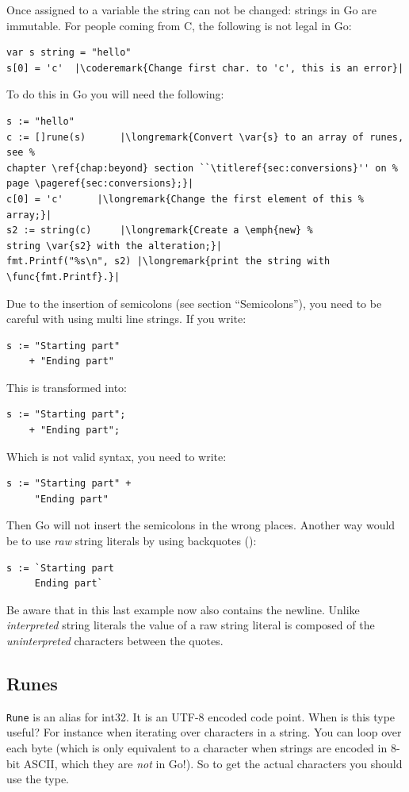Once assigned to a variable the string can not be changed: strings in Go are
immutable. For
people coming from C, the following is not legal in Go:
\begin{lstlisting}
var s string = "hello"
s[0] = 'c'  |\coderemark{Change first char. to 'c', this is an error}|
\end{lstlisting}
To do this in Go you will need the following:
\begin{lstlisting}
s := "hello"
c := []rune(s)	    |\longremark{Convert \var{s} to an array of runes, see %
chapter \ref{chap:beyond} section ``\titleref{sec:conversions}'' on %
page \pageref{sec:conversions};}|
c[0] = 'c'	    |\longremark{Change the first element of this %
array;}|
s2 := string(c)     |\longremark{Create a \emph{new} %
string \var{s2} with the alteration;}|
fmt.Printf("%s\n", s2) |\longremark{print the string with \func{fmt.Printf}.}|
\end{lstlisting}
\showremarks

\begin{lbar}
Due to the insertion of semicolons (see \cite{effective_go} section
``Semicolons''), you need to be careful with using multi line strings. If
you write:
\begin{lstlisting}
s := "Starting part"
    + "Ending part"
\end{lstlisting}
This is transformed into:
\begin{lstlisting}
s := "Starting part";
    + "Ending part";
\end{lstlisting}
Which is not valid syntax, you need to write:
\begin{lstlisting}
s := "Starting part" +
     "Ending part"
\end{lstlisting}
Then Go will not insert the semicolons in the wrong places. Another way
would be to use \emph{raw} string literals by using backquotes ():
\begin{lstlisting}
s := `Starting part
     Ending part`
\end{lstlisting}
Be aware that in this last example  now also contains the newline.
Unlike \emph{interpreted} string literals  the value of a raw string literal
is composed of the \emph{uninterpreted} characters between the quotes.
\end{lbar}

\subsection{Runes}
\lstinline{Rune} is an alias for int32. It is an UTF-8 encoded code point. When is this type useful? For instance
when iterating over characters in a string. You can loop over each byte (which is only equivalent to a character
when strings are encoded in 8-bit ASCII, which they are \emph{not} in Go!). So to get the actual characters you
should use the  type.

